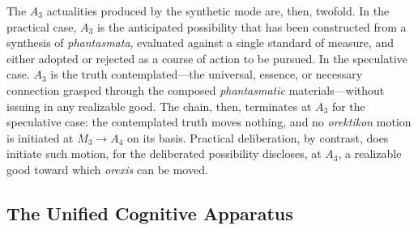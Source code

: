 \documentclass{article}
\begin{document}
The $A_3$ actualities produced by the synthetic mode are, then, twofold. In the practical case, $A_3$ is the anticipated possibility that has been constructed from a synthesis of \textit{phantasmata}, evaluated against a single standard of measure, and either adopted or rejected as a course of action to be pursued. In the speculative case. $A_3$ is the truth contemplated---the universal, essence, or necessary connection grasped through the composed \textit{phantasmatic} materials---without issuing in any realizable good. The chain, then, terminates at $A_3$ for the speculative case: the contemplated truth moves nothing, and no \textit{orektikon} motion is initiated at $M_3 \to A_4$ on its basis. Practical deliberation, by contrast, does initiate such motion, for the deliberated possibility discloses, at $A_3$, a realizable good toward which \textit{orexis} can be moved.

\subsection{The Unified Cognitive Apparatus}
\end{document}
